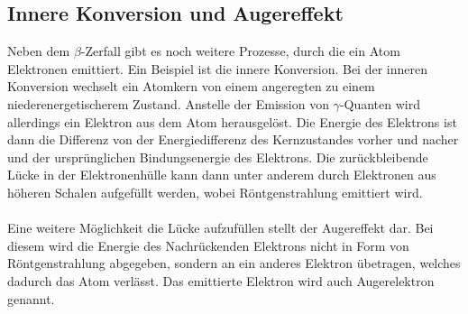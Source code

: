 \subsection{Innere Konversion und Augereffekt}
Neben dem $\beta$-Zerfall gibt es noch weitere Prozesse, durch die ein Atom Elektronen emittiert. Ein Beispiel ist die innere Konversion. Bei der inneren Konversion wechselt ein Atomkern von einem angeregten zu einem niederenergetischerem Zustand. Anstelle der Emission von $\gamma$-Quanten wird allerdings ein Elektron aus dem Atom herausgelöst. Die Energie des Elektrons ist dann die Differenz von der Energiedifferenz des Kernzustandes vorher und nacher und der ursprünglichen Bindungsenergie des Elektrons. Die zurückbleibende Lücke in der Elektronenhülle kann dann unter anderem durch Elektronen aus höheren Schalen aufgefüllt werden, wobei Röntgenstrahlung emittiert wird.\\ \\
Eine weitere Möglichkeit die Lücke aufzufüllen stellt der Augereffekt dar. Bei diesem wird die Energie des Nachrückenden Elektrons nicht in Form von Röntgenstrahlung abgegeben, sondern an ein anderes Elektron übetragen, welches dadurch das Atom verlässt. Das emittierte Elektron wird auch Augerelektron genannt.


